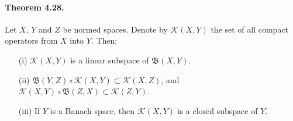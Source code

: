 \documentclass{article}
\begin{document}
\paragraph{Theorem 4.28.\label{thm:4.28}} Let $X$, $Y$ and $Z$ be normed spaces. Denote by $\mathcal{K}(X,Y)$ the set of all compact operators from $X$ into $Y$. Then:
\begin{itemize}
	\vspace{0.1cm}
	\item[(i)] $\mathcal{K}(X,Y)$ is a linear subspace of $\mathfrak{B}(X,Y)$.
	\vspace{0.1cm}
	\item[(ii)] $\mathfrak{B}(Y,Z)\circ\mathcal{K}(X,Y)\subset\mathcal{K}(X,Z)$, and $\mathcal{K}(X,Y)\circ\mathfrak{B}(Z,X)\subset\mathcal{K}(Z,Y)$.
	\vspace{0.1cm}
	\item[(iii)] If $Y$ is a Banach space, then $\mathcal{K}(X,Y)$ is a closed subspace of $Y$.
\end{itemize}
\end{document}
